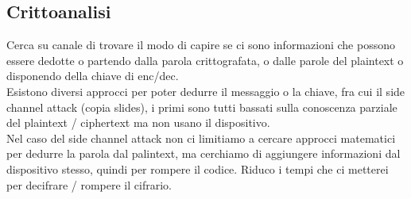 \documentclass[oneside, 12pt]{extbook}
\begin{document}
\subsection{Crittoanalisi}
Cerca su canale di trovare il modo di capire se ci sono informazioni che possono essere dedotte o partendo dalla parola crittografata, o dalle parole del plaintext o disponendo della chiave di enc/dec.\\Esistono diversi approcci per poter dedurre il messaggio o la chiave, fra cui il side channel attack (copia slides), i primi sono tutti bassati sulla conoscenza parziale del plaintext / ciphertext ma non usano il dispositivo.\\Nel caso del side channel attack non ci limitiamo a cercare approcci matematici per dedurre la parola dal palintext, ma cerchiamo di aggiungere informazioni dal dispositivo stesso, quindi per rompere il codice. Riduco i tempi che ci metterei per decifrare / rompere il cifrario.
\end{document}
